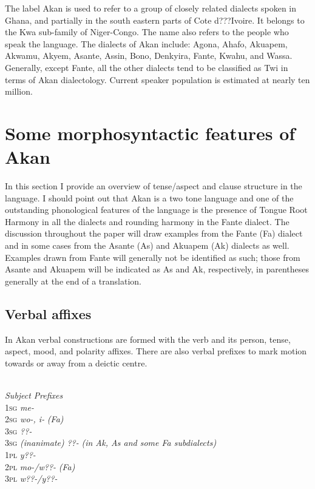 \documentclass[output=paper]{langsci/langscibook}
\begin{document}
The label Akan is used to refer to a group of closely related dialects spoken in Ghana, and partially in the south eastern parts of Cote d???Ivoire. It belongs to the Kwa sub-family of Niger-Congo. The name also refers to the people who speak the language. The dialects of Akan include: Agona, Ahafo, Akuapem, Akwamu, Akyem, Asante, Assin, Bono, Denkyira, Fante, Kwahu, and Wassa. Generally, except Fante, all the other dialects tend to be classified as Twi in terms of Akan dialectology. Current speaker population is estimated at nearly ten million.

\section{Some morphosyntactic features of Akan}

In this section I provide an overview of tense/aspect and clause structure in the language. I should point out that Akan is a two tone language and one of the outstanding phonological features of the language is the presence of Tongue Root Harmony in all the dialects and rounding harmony in the Fante dialect. The discussion throughout the paper will draw examples from the Fante (Fa) dialect and in some cases from the Asante (As) and Akuapem (Ak) dialects as well. Examples drawn from Fante will generally not be identified as such; those from Asante and Akuapem will be indicated as As and Ak, respectively, in parentheses generally at the end of a translation.


\subsection{Verbal affixes}

In Akan verbal constructions are  formed with the verb and its person, tense, aspect, mood, and polarity affixes. There are also verbal prefixes to mark motion towards or away from a deictic centre.


\ea
{}\\

     \emph{        }\emph{\textup{Subject }}\emph{\textup{Prefixes}}\\
     \textsc{1sg  }\emph{ }\emph{me-}\\
     \textsc{2sg  }\emph{      wo-, i- }\emph{\textup{(Fa)}}\\
     \textsc{3sg  }\emph{      ??{}-}\\
     \textsc{3sg}\emph{\textup{ (inanimate)}}\emph{    ??{}- }\emph{\textup{(in Ak, As and some Fa subdialects)}}\\
     \textsc{1pl  }\emph{      y??-}\\
     \textsc{2pl  }\emph{      mo-/w??- }\emph{\textup{(Fa)}}\emph{  }\\
     \textsc{3pl  }\emph{      w??-/y??-}\\
     \z
     
\end{document}
